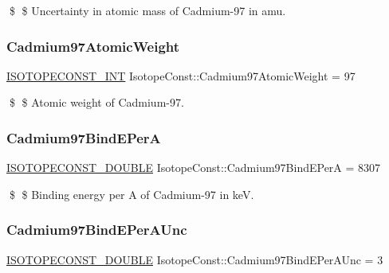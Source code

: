 \$ \$ Uncertainty in atomic mass of Cadmium-\/97 in amu. \mbox{\label{group___isotope_const-_cadmium-_cd97_gac46cc65fe0c8d28771a9bfd4dc6d3464}} 
\subsubsection{\texorpdfstring{Cadmium97\+Atomic\+Weight}{Cadmium97AtomicWeight}}
{\footnotesize\ttfamily \mbox{\hyperlink{group___isotope_const-_macros_ga5f18360b3e99483a35c32d789e62621c}{I\+S\+O\+T\+O\+P\+E\+C\+O\+N\+S\+T\+\_\+\+I\+NT}} Isotope\+Const\+::\+Cadmium97\+Atomic\+Weight = 97}

\$ \$ Atomic weight of Cadmium-\/97. \mbox{\label{group___isotope_const-_cadmium-_cd97_gab2445f8a48d84c194c2565a0bc6d3529}} 
\subsubsection{\texorpdfstring{Cadmium97\+Bind\+E\+PerA}{Cadmium97BindEPerA}}
{\footnotesize\ttfamily \mbox{\hyperlink{group___isotope_const-_macros_ga8f45a7272ce02c0b4c65c44636ed719a}{I\+S\+O\+T\+O\+P\+E\+C\+O\+N\+S\+T\+\_\+\+D\+O\+U\+B\+LE}} Isotope\+Const\+::\+Cadmium97\+Bind\+E\+PerA = 8307}

\$ \$ Binding energy per A of Cadmium-\/97 in keV. \mbox{\label{group___isotope_const-_cadmium-_cd97_ga5aef53d8892a6171d90fdfe613604cc9}} 
\subsubsection{\texorpdfstring{Cadmium97\+Bind\+E\+Per\+A\+Unc}{Cadmium97BindEPerAUnc}}
{\footnotesize\ttfamily \mbox{\hyperlink{group___isotope_const-_macros_ga8f45a7272ce02c0b4c65c44636ed719a}{I\+S\+O\+T\+O\+P\+E\+C\+O\+N\+S\+T\+\_\+\+D\+O\+U\+B\+LE}} Isotope\+Const\+::\+Cadmium97\+Bind\+E\+Per\+A\+Unc = 3}

